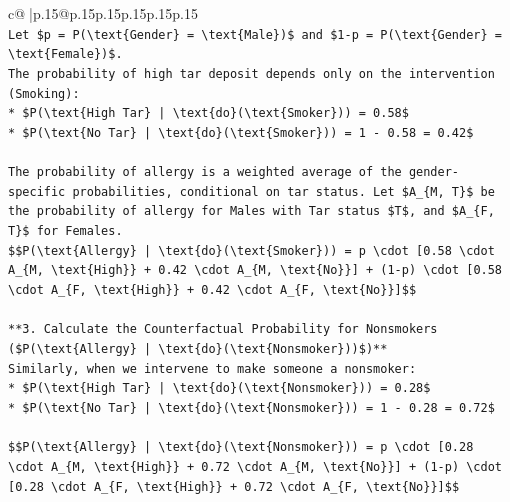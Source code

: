 \documentclass{article}
\begin{document}
{\begin{supertabular}{c@{$\;$}|p{.15\linewidth}@{}p{.15\linewidth}p{.15\linewidth}p{.15\linewidth}p{.15\linewidth}p{.15\linewidth}}
{{{\\ 
\texttt{Let \$p = P(\textbackslash{}text\{Gender\} = \textbackslash{}text\{Male\})\$ and \$1{-}p = P(\textbackslash{}text\{Gender\} = \textbackslash{}text\{Female\})\$.} \\
\texttt{The probability of high tar deposit depends only on the intervention (Smoking):} \\
\texttt{*   \$P(\textbackslash{}text\{High Tar\} | \textbackslash{}text\{do\}(\textbackslash{}text\{Smoker\})) = 0.58\$} \\
\texttt{*   \$P(\textbackslash{}text\{No Tar\} | \textbackslash{}text\{do\}(\textbackslash{}text\{Smoker\})) = 1 {-} 0.58 = 0.42\$} \\
\\ 
\texttt{The probability of allergy is a weighted average of the gender{-}specific probabilities, conditional on tar status. Let \$A\_\{M, T\}\$ be the probability of allergy for Males with Tar status \$T\$, and \$A\_\{F, T\}\$ for Females.} \\
\texttt{\$\$P(\textbackslash{}text\{Allergy\} | \textbackslash{}text\{do\}(\textbackslash{}text\{Smoker\})) = p \textbackslash{}cdot {[}0.58 \textbackslash{}cdot A\_\{M, \textbackslash{}text\{High\}\} + 0.42 \textbackslash{}cdot A\_\{M, \textbackslash{}text\{No\}\}{]} + (1{-}p) \textbackslash{}cdot {[}0.58 \textbackslash{}cdot A\_\{F, \textbackslash{}text\{High\}\} + 0.42 \textbackslash{}cdot A\_\{F, \textbackslash{}text\{No\}\}{]}\$\$} \\
\\ 
\texttt{**3. Calculate the Counterfactual Probability for Nonsmokers (\$P(\textbackslash{}text\{Allergy\} | \textbackslash{}text\{do\}(\textbackslash{}text\{Nonsmoker\}))\$)**} \\
\texttt{Similarly, when we intervene to make someone a nonsmoker:} \\
\texttt{*   \$P(\textbackslash{}text\{High Tar\} | \textbackslash{}text\{do\}(\textbackslash{}text\{Nonsmoker\})) = 0.28\$} \\
\texttt{*   \$P(\textbackslash{}text\{No Tar\} | \textbackslash{}text\{do\}(\textbackslash{}text\{Nonsmoker\})) = 1 {-} 0.28 = 0.72\$} \\
\\ 
\texttt{\$\$P(\textbackslash{}text\{Allergy\} | \textbackslash{}text\{do\}(\textbackslash{}text\{Nonsmoker\})) = p \textbackslash{}cdot {[}0.28 \textbackslash{}cdot A\_\{M, \textbackslash{}text\{High\}\} + 0.72 \textbackslash{}cdot A\_\{M, \textbackslash{}text\{No\}\}{]} + (1{-}p) \textbackslash{}cdot {[}0.28 \textbackslash{}cdot A\_\{F, \textbackslash{}text\{High\}\} + 0.72 \textbackslash{}cdot A\_\{F, \textbackslash{}text\{No\}\}{]}\$\$} \\
}}}
\end{supertabular}}
\end{document}
